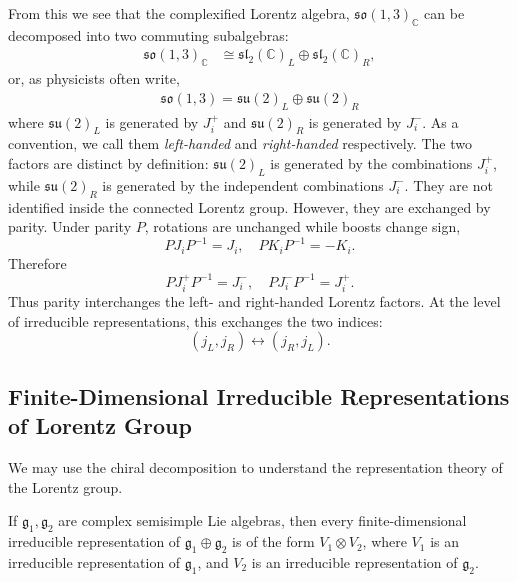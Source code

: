 From this we see that the complexified Lorentz algebra, $\mathfrak{so}(1,3)_{\mathbb{C}}$ can be decomposed into two commuting subalgebras:
\begin{align*}
    \mathfrak{so}(1,3)_{\mathbb{C}} &\cong \mathfrak{sl}_2(\mathbb{C})_L 
    \oplus \mathfrak{sl}_2(\mathbb{C})_R,
\end{align*}
or, as physicists often write,
\begin{align}
\mathfrak{s o}(1,3)=\mathfrak{s u}(2)_L \oplus \mathfrak{s u}(2)_R
\end{align}
where $\mathfrak{su}(2)_L$ is generated by $J_i^+$ and $\mathfrak{su}(2)_R$ is generated by $J_i^-$. As a convention, we call them \textit{left-handed} and \textit{right-handed} respectively.
The two factors are distinct by definition: $\mathfrak{su}(2)_L$ is generated by the combinations $J_i^+$, while $\mathfrak{su}(2)_R$ is generated by the independent combinations $J_i^-$. They are not identified inside the connected Lorentz group. However, they are exchanged by parity. Under parity $P$, rotations are unchanged while boosts change sign,
\[
    P J_i P^{-1} = J_i, \quad P K_i P^{-1} = -K_i.
\]
Therefore
\[
    P J_i^+ P^{-1} = J_i^-, \quad P J_i^- P^{-1} = J_i^+.
\]
Thus parity interchanges the left- and right-handed Lorentz factors. At the level of irreducible representations, this exchanges the two indices:
\[
    (j_L,j_R) \longleftrightarrow (j_R,j_L).
\]

\subsection{Finite-Dimensional Irreducible Representations of Lorentz Group}
\label{subsec:finite-dimensional-irreducible-representations-of-lorentz-group}

We may use the chiral decomposition to understand the representation theory of the Lorentz group.

\begin{fact}
If $\mathfrak{g}_1, \mathfrak{g}_2$ are complex semisimple Lie algebras, then every finite-dimensional irreducible representation of
$\mathfrak{g}_1 \oplus \mathfrak{g}_2 $
is of the form $V_1 \otimes V_2$,
where $V_1$ is an irreducible representation of $\mathfrak{g}_1$, and $V_2$ is an irreducible representation of $\mathfrak{g}_2$.
\end{fact}

